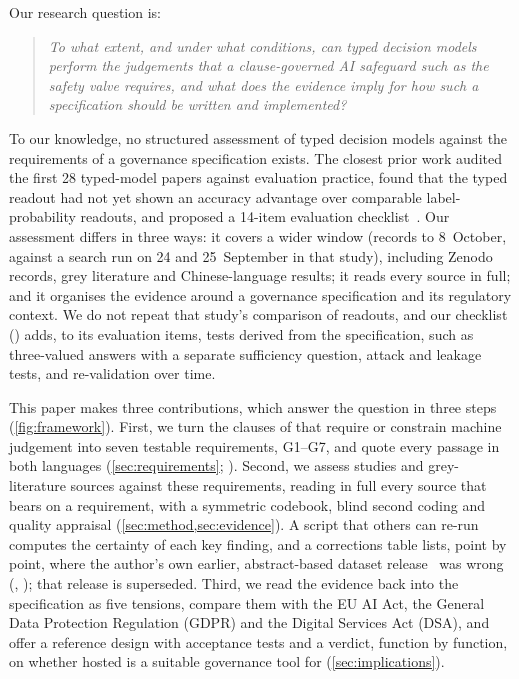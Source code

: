 Our research question is:
\begin{quote}
\emph{To what extent, and under what conditions, can typed decision models perform the judgements that a clause-governed AI safeguard such as the \pol{} safety valve requires, and what does the evidence imply for how such a specification should be written and implemented?}
\end{quote}
To our knowledge, no structured assessment of typed decision models against the requirements of a governance specification exists.
The closest prior work audited the first 28 typed-model papers against evaluation practice, found that the typed readout had not yet shown an accuracy advantage over comparable label-probability readouts, and proposed a 14-item evaluation checklist~\cite{arx32160}.
Our assessment differs in three ways: it covers a wider window (records to 8~October, against a search run on 24 and 25~September in that study), including Zenodo records, grey literature and Chinese-language results; it reads every source in full; and it organises the evidence around a governance specification and its regulatory context.
We do not repeat that study's comparison of readouts, and our checklist () adds, to its evaluation items, tests derived from the specification, such as three-valued answers with a separate sufficiency question, attack and leakage tests, and re-validation over time.

This paper makes three contributions, which answer the question in three steps (\cref{fig:framework}).
First, we turn the clauses of \pol{} that require or constrain machine judgement into seven testable requirements, G1--G7, and quote every passage in both languages (\cref{sec:requirements}; ).
Second, we assess \nStudies{} studies and \nGreyAll{} grey-literature sources against these requirements, reading in full every source that bears on a requirement, with a symmetric codebook, blind second coding and quality appraisal (\cref{sec:method,sec:evidence}).
A script that others can re-run computes the certainty of each key finding, and a corrections table lists, point by point, where the author's own earlier, abstract-based dataset release~\cite{survey01} was wrong (, ); that release is superseded.
Third, we read the evidence back into the specification as five tensions, compare them with the EU AI Act, the General Data Protection Regulation (GDPR) and the Digital Services Act (DSA), and offer a reference design with acceptance tests and a verdict, function by function, on whether hosted \jev{} is a suitable governance tool for \pol{} (\cref{sec:implications}).

